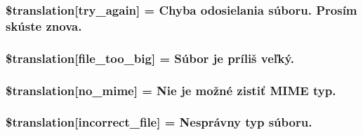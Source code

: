 \subsubsection[{\$translation}]{\setlength{\rightskip}{0pt plus 5cm}\$translation\mbox{[}\textquotesingle{}try\+\_\+again\textquotesingle{}\mbox{]} = \textquotesingle{}Chyba odosielania súboru. Prosím skúste znova.\textquotesingle{}}\label{class_8upload_8sk___s_k_8php_a3afc377bd803683314f413a814243066}
\hypertarget{class_8upload_8sk___s_k_8php_a476278eb4a0c3df56af068e2d511a741}{}
\subsubsection[{\$translation}]{\setlength{\rightskip}{0pt plus 5cm}\$translation\mbox{[}\textquotesingle{}file\+\_\+too\+\_\+big\textquotesingle{}\mbox{]} = \textquotesingle{}Súbor je príliš veľký.\textquotesingle{}}\label{class_8upload_8sk___s_k_8php_a476278eb4a0c3df56af068e2d511a741}
\hypertarget{class_8upload_8sk___s_k_8php_a191a55df8e3bb7f3c51b70f3c1932e02}{}
\subsubsection[{\$translation}]{\setlength{\rightskip}{0pt plus 5cm}\$translation\mbox{[}\textquotesingle{}no\+\_\+mime\textquotesingle{}\mbox{]} = \textquotesingle{}Nie je možné zistiť M\+I\+M\+E typ.\textquotesingle{}}\label{class_8upload_8sk___s_k_8php_a191a55df8e3bb7f3c51b70f3c1932e02}
\hypertarget{class_8upload_8sk___s_k_8php_a4d32343e2699edd6fd435f9c832cb9c7}{}
\subsubsection[{\$translation}]{\setlength{\rightskip}{0pt plus 5cm}\$translation\mbox{[}\textquotesingle{}incorrect\+\_\+file\textquotesingle{}\mbox{]} = \textquotesingle{}Nesprávny typ súboru.\textquotesingle{}}\label{class_8upload_8sk___s_k_8php_a4d32343e2699edd6fd435f9c832cb9c7}
\hypertarget{class_8upload_8sk___s_k_8php_a0dd3e4930ca1f59ae280f4b1006525cd}{}
